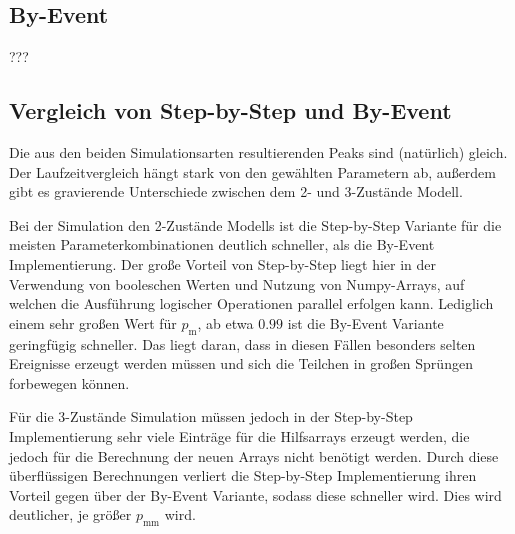 \subsection{By-Event}
???

\subsection{Vergleich von Step-by-Step und By-Event}
Die aus den beiden Simulationsarten resultierenden Peaks sind (natürlich) gleich. Der Laufzeitvergleich hängt stark von den gewählten Parametern ab, außerdem gibt es gravierende Unterschiede zwischen dem 2- und 3-Zustände Modell.

Bei der Simulation den 2-Zustände Modells ist die Step-by-Step Variante für die meisten Parameterkombinationen deutlich schneller, als die By-Event Implementierung. Der große Vorteil von Step-by-Step liegt hier in der Verwendung von booleschen Werten und Nutzung von Numpy-Arrays, auf welchen die Ausführung logischer Operationen parallel erfolgen kann. Lediglich einem sehr großen Wert für $p_{\text{m}}$, ab etwa $0.99$ ist die By-Event Variante geringfügig schneller. Das liegt daran, dass in diesen Fällen besonders selten Ereignisse erzeugt werden müssen und sich die Teilchen in großen Sprüngen forbewegen können. 

Für die 3-Zustände Simulation müssen jedoch in der Step-by-Step Implementierung sehr viele Einträge für die Hilfsarrays erzeugt werden, die jedoch für die Berechnung der neuen Arrays nicht benötigt werden. Durch diese überflüssigen Berechnungen verliert die Step-by-Step Implementierung ihren Vorteil gegen über der By-Event Variante, sodass diese schneller wird. Dies wird deutlicher, je größer $p_{\text{mm}}$ wird.



